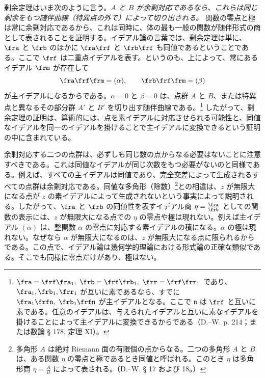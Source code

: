 \documentclass[11pt]{article}
\begin{document}
剰余定理はいま次のように言う。\emph{\(A\) と \(B\) が余剰対応であるなら、これらは同じ剰余をもつ随伴曲線（特異点の外で）によって切り出される。} 関数の零点と極は常に余剰対応であるから、これは同時に、体の最も一般の関数が随伴形式の商として表されることを証明する。イデアル論の言葉では、剰余定理は単に、\(\fra\) と \(\frb\) のほかに \(\fra\frf\) と \(\frb\frf\) も同値であるということである。ここで \(\frf\) は二重点イデアルを表す。というのも、上によって、常にあるイデアル \(\frm\) が存在して
\[
\fra\frf\frm=(\alpha),\qquad \frb\frf\frm=(\beta)
\]
が主イデアルになるからである。\(\alpha=0\) と \(\beta=0\) は、点群 \(A\) と \(B\)、または特異点と異なるその部分群 \(A'\) と \(B'\) を切り出す随伴曲線である。\footnote{\(\fra=\frf\fra_1,\ \frb=\frf\frb_1,\ \frr=\frf\frr_1\) であり、\(\fra_1,\frb_1,\frr_1\) が互いに素であるなら、すでに \(\fra_1\frf\mathfrak n,\ \frb_1\frf\mathfrak n\) が主イデアルとなる。ここで \(\mathfrak n\) は \(\frf\) と互いに素である。任意のイデアルは、与えられたイデアルと互いに素なイデアルを掛けることによって主イデアルに変換できるからである（D.--W. p. 214；または数論 § 178, 定理 XI）。} したがって、剰余定理の証明は、算術的には、点を素イデアルに対応させられる可能性と、同値なイデアルを同一のイデアルを掛けることで主イデアルに変換できるという証明の中に含まれている。

余剰対応する二つの点群は、必ずしも同じ数の点からなる必要はないことに注意すべきである。これは同値なイデアルが同じ次数をもつ必要がないのと同様である。例えば、すべての主イデアルは同値であり、完全交差によって生成されるすべての点群は余剰対応である。同値な多角形（除数）\footnote{多角形 \(A\) は絶対 Riemann 面の有限個の点からなる。二つの多角形 \(A\) と \(B\) は、ある関数 \(\eta\) の零点と極であるとき同値と呼ばれる。このとき \(\eta\) は多角形商 \(\eta=\frac{A}{B}\) によって表される。（D.--W. § 17 および 18。）}との相違は、\(z\) が無限大になる点が \(z\) の素イデアルによって生成されないという事実によって説明される。したがって、\(\fra\) と \(\frb\) の同値性を表すイデアル商 \(\eta=\frac{\fra}{\frb}\) としての関数の表示には、\(z\) が無限大になる点での \(\eta\) の零点や極は現れない。例えば主イデアル \((\alpha)\) は、整関数 \(\alpha\) の零点に対応する素イデアルの積になる。\(\alpha\) の極は現れない。なぜなら \(\alpha\) が無限大になるのは、\(z\) が無限大になる点に限られるからである。この点で、イデアル論は幾何学的理論における形式論の正確な類似である。そこでも同様に零点だけがあり、極はない。
\end{document}
